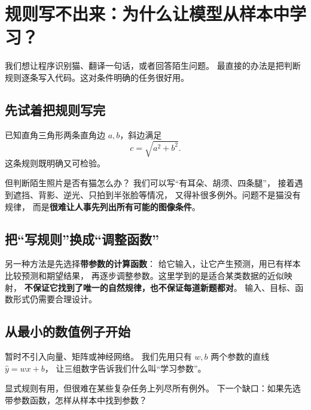 \chapterrule
\section{规则写不出来：为什么让模型从样本中学习？}
\label{intro:00d-rules-gap}

我们想让程序识别猫、翻译一句话，或者回答陌生问题。
最直接的办法是把判断规则逐条写入代码。这对条件明确的任务很好用。

\subsection{先试着把规则写完}

已知直角三角形两条直角边 $a,b$，斜边满足
\[
c=\sqrt{a^2+b^2}.
\]
这条规则既明确又可检验。

但判断陌生照片是否有猫怎么办？
我们可以写“有耳朵、胡须、四条腿”，
接着遇到遮挡、背影、逆光、只拍到半张脸等情况，
又得补很多例外。问题不是猫没有规律，
而是\textbf{很难让人事先列出所有可能的图像条件}。

\subsection{把“写规则”换成“调整函数”}

另一种方法是先选择\textbf{带参数的计算函数}：
给它输入，让它产生预测，用已有样本比较预测和期望结果，
再逐步调整参数。这里学到的是适合某类数据的近似映射，
\textbf{不保证它找到了唯一的自然规律，也不保证每道新题都对}。
输入、目标、函数形式仍需要合理设计。

\subsection{从最小的数值例子开始}

暂时不引入向量、矩阵或神经网络。
我们先用只有 $w,b$ 两个参数的直线 $\widehat{y}=wx+b$，
让三组数字告诉我们什么叫“学习参数”。



\begin{conclusion}
显式规则有用，但很难在某些复杂任务上列尽所有例外。
下一个缺口：如果先选带参数函数，怎样从样本中找到参数？
\end{conclusion}
